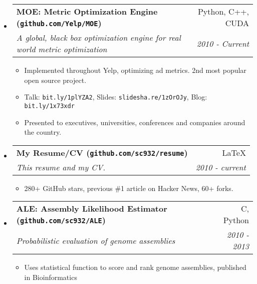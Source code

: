 \documentclass[letterpaper,11pt]{article}
\makeatletter
\newlength{\outerbordwidth}
\newcommand{\resitem}[1]{\item #1 \vspace{-2pt}}
\newcommand{\resheading}[1]{\vspace{8pt}
  \parbox{\textwidth}{\setlength{\FrameSep}{\outerbordwidth}
    \begin{shaded}

\setlength{\fboxsep}{0pt}\framebox[\textwidth][l]{\setlength{\fboxsep}{4pt}\fcolorbox{shadecolorB}{shadecolorB}{\textbf{\sffamily{\mbox{~}\makebox[6.762in][l]{\large #1} \vphantom{p\^{E}}}}}}
    \end{shaded}
  }\vspace{-5pt}
}
\newcommand{\ressubheading}[4]{
\begin{tabular*}{6.5in}{l@{\cftdotfill{\cftsecdotsep}\extracolsep{\fill}}r}
		\textbf{#1} & #2 \\
		\textit{#3} & \textit{#4} \\
\end{tabular*}\vspace{-6pt}}
\makeatother
\begin{document}
\begin{itemize}

\item
    \ressubheading{MOE: Metric Optimization Engine (\texttt{github.com/Yelp/MOE})}{Python, C++, CUDA}{A global, black box optimization engine for real world metric optimization}{2010 - Current}
    \begin{itemize}
        \resitem{Implemented throughout Yelp, optimizing ad metrics. 2nd most popular open source project.}
        \resitem{Talk: \texttt{bit.ly/1plYZA2}, Slides: \texttt{slidesha.re/1zOrOJy}, Blog: \texttt{bit.ly/1x73xdr}}
        \resitem{Presented to executives, universities, conferences and companies around the country.}
	\end{itemize}

\item
    \ressubheading{My Resume/CV (\texttt{github.com/sc932/resume})}{\LaTeX}{This resume and my CV.}{2010 - current}
    \begin{itemize}
        \resitem{280+ GitHub stars, previous \#1 article on Hacker News, 60+ forks.}
	\end{itemize}

\item
    \ressubheading{ALE: Assembly Likelihood Estimator (\texttt{github.com/sc932/ALE})}{C, Python}{Probabilistic evaluation of genome assemblies}{2010 - 2013}
    \begin{itemize}
        \resitem{Uses statistical function to score and rank genome assemblies, published in Bioinformatics}
	\end{itemize}

\end{itemize}

\begin{comment}
\resheading{Writing and Awards}

\begin{itemize}

\item {\bf Department of Energy Computational Science Graduate Fellow:} Four year full fellowship. $\sim$20 awarded nationally per year. Won the Communicating Science award (\texttt{bit.ly/VbcTZK}).
\item {\bf Yelp Blog:} Wrote several posts announcing the open sourcing of MOE, the Yelp Dataset Challenge and more. \texttt{bit.ly/1x73xdr}, \texttt{bit.ly/1oCCZvv}, \texttt{bit.ly/1sOsEBS}, \texttt{bit.ly/1plX7Hk}
\item {\bf Press:} WSJ: \texttt{on.wsj.com/VaOvqQ}, Cornell: \texttt{bit.ly/1oB2dzm},  DIEXIS: \texttt{bit.ly/1oofbl4}

\end{itemize}
\end{comment}
\end{document}
